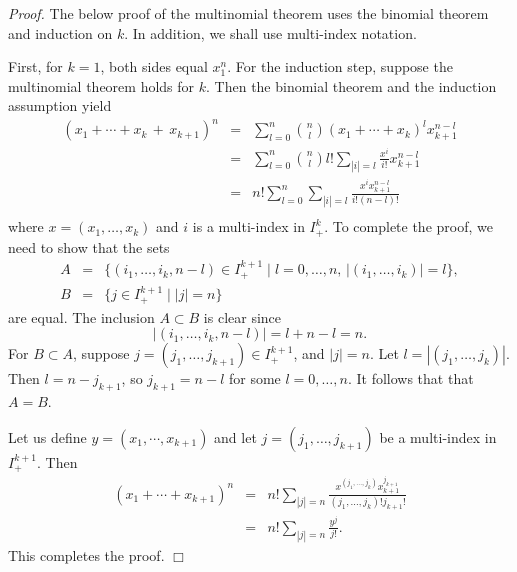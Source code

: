 \documentclass[12pt]{article}
\begin{document}
\emph{Proof.} The below proof of the multinomial theorem uses 
the binomial theorem and  induction on $k$. 
In addition, we shall use multi-index notation.

First, 
for $k=1$, both sides equal $x_1^n$. For the induction step,
suppose the multinomial theorem holds for $k$. 
Then the binomial theorem and the induction assumption yield
\begin{eqnarray*}
(x_1+\cdots + x_k\,+\,x_{k+1})^n &=& \sum_{l=0}^n {n \choose l} (x_1+\cdots + x_k)^l x_{k+1}^{n-l}\\
&=& \sum_{l=0}^n {n \choose l} l! \sum_{|i|=l} \frac{x^i}{i!} x_{k+1}^{n-l}\\
&=& n! \sum_{l=0}^n \sum_{|i|=l} \frac{x^i x_{k+1}^{n-l}}{i! (n-l)!} \\
\end{eqnarray*}
where $x=(x_1,\ldots, x_k)$ and $i$ is a multi-index in $I^k_+$. To complete the proof, we need to show that
the sets 
\begin{eqnarray*}
A&=&\{ (i_1,\ldots,i_k, n-l)\in I^{k+1}_+ \mid l=0,\ldots, n,\, |(i_1,\ldots, i_k)|=l \}, \\
B&=&\{j \in I^{k+1}_+ \mid |j|=n \} 
\end{eqnarray*}
are equal.
The inclusion $A \subset B$ is clear since 
$$ |(i_1,\ldots,i_k, n-l)| = l + n-l = n.$$
For $B \subset A$, suppose $j=(j_1,\ldots, j_{k+1}) \in I^{k+1}_+$,
and $|j|=n$. Let $l=|(j_1,\ldots, j_k)|$. Then $l=n-j_{k+1}$, 
so $j_{k+1} = n-l$ for some $l=0,\ldots, n$. 
It follows that that $A=B$.

Let us define $y=(x_1,\cdots, x_{k+1})$ and let 
$j=(j_1,\ldots, j_{k+1})$ be a multi-index in $I_+^{k+1}$. 
Then 
\begin{eqnarray*}
(x_1+\cdots + x_{k+1})^n &=& n! \sum_{|j|=n} \frac{x^{(j_1,\ldots, j_k)} x_{k+1}^{j_{k+1}}}{(j_1,\ldots, j_k)! j_{k+1}!} \\
&=& n! \sum_{|j|=n} \frac{y^j}{j!}.
\end{eqnarray*}
This completes the proof. $\Box$
\end{document}
